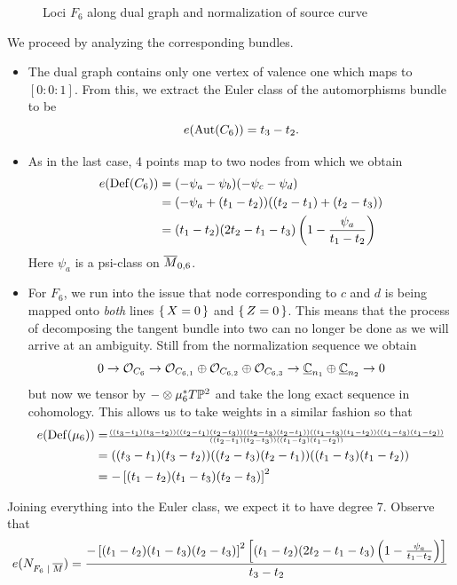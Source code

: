 \documentclass[12pt]{memoir}
\begin{document}
\begin{Ex}
\begin{figure}[h!]
        \caption{Loci $F_6$ along dual graph and normalization of source curve}
        \label{fig:quadratic-F6-5-marks}
    \end{figure}
    We proceed by analyzing the corresponding bundles.
    \begin{itemize}
        \item The dual graph contains only one vertex of valence one which maps to $[0:0:1]$. From this, we extract the Euler class of the automorphisms bundle to be 
        $$e(\operatorname{Aut}(C_6))=t_3-t_2.$$
        \item As in the last case, 4 points map to two nodes from which we obtain 
        \begin{align*}
            e(\operatorname{Def}(C_6))&=(-\psi_a-\psi_b)(-\psi_c-\psi_d)\\
            &=(-\psi_a+(t_1-t_2))((t_2-t_1)+(t_2-t_3))\\
            &=(t_1-t_2)(2t_2-t_1-t_3)\left(1-\frac{\psi_a}{t_1-t_2}\right)
        \end{align*}
        Here $\psi_a$ is a psi-class on $\overline M_{0,6}$.
        \item For $F_6$, we run into the issue that node corresponding to $c$ and $d$ is being mapped onto \emph{both} lines $\{\,X=0\,\}$ and $\{\,Z=0\,\}$. This means that the process of decomposing the tangent bundle into two can no longer be done as we will arrive at an ambiguity. Still from the normalization sequence we obtain
        $$0\to\mathcal{O}_{C_6}\to\mathcal{O}_{C_{6,1}}\oplus\mathcal{O}_{C_{6,2}}\oplus\mathcal{O}_{C_{6,3}}\to\underline{\mathbb{C}}_{n_1}\oplus\underline{\mathbb{C}}_{n_2}\to 0$$
        but now we tensor by $-\otimes\mu_6^\ast T\mathbb{P}^2$ and take the long exact sequence in cohomology. This allows us to take weights in a similar fashion so that 
        \begin{align*}
             e(\operatorname{Def}(\mu_6))&=\scriptstyle\frac{((t_3-t_1)(t_3-t_2))((t_2-t_1)(t_2-t_3))((t_2-t_3)(t_2-t_1))((t_1-t_3)(t_1-t_2))((t_1-t_3)(t_1-t_2))}{((t_2-t_1)(t_2-t_3))((t_1-t_3)(t_1-t_2))}\\
             &=((t_3-t_1)(t_3-t_2))((t_2-t_3)(t_2-t_1))((t_1-t_3)(t_1-t_2))\\
             &=-\left\lbrack(t_1-t_2)(t_1-t_3)(t_2-t_3)\right\rbrack^2
        \end{align*}
    \end{itemize}
    Joining everything into the Euler class, we expect it to have degree 7. Observe that 
    \begin{align*}
        e(N_{F_6\mid\ov M})&=\frac{-\bonj{(t_1-t_2)(t_1-t_3)(t_2-t_3)}^2\bonj{(t_1-t_2)(2t_2-t_1-t_3)\left(1-\frac{\psi_a}{t_1-t_2}\right)}}{t_3-t_2}\\

\end{align*}
\end{Ex}
\end{document}
